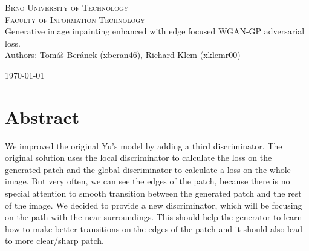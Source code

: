 \documentclass[a4paper, 11pt]{article}
\begin{document}
    \begin{titlepage}
 \begin{center}
  {\Huge\textsc{Brno University of Technology\\[0.3em]
    \huge{Faculty of Information Technology}}}\\
  {\Huge
  Generative image inpainting enhanced with edge focused WGAN-GP adversarial loss.}\\
  {\Large Authors: Tomáš Beránek (xberan46), Richard Klem (xklemr00)}
 \end{center}
 {\Large 
 \today 
 \hfill
}
\end{titlepage}

\newpage
\section{Abstract}
\label{section:abstract}
We improved the original Yu's \cite{Yu} model by adding a third discriminator. The original solution uses the local discriminator to calculate the loss on the generated patch and the global discriminator to calculate a loss on the whole image. But very often, we can see the edges of the patch, because there is no special attention to smooth transition between the generated patch and the rest of the image. We decided to provide a new discriminator, which will be focusing on the path with the near surroundings. This should help the generator to learn how to make better transitions on the edges of the patch and it should also lead to more clear/sharp patch.
\end{document}
